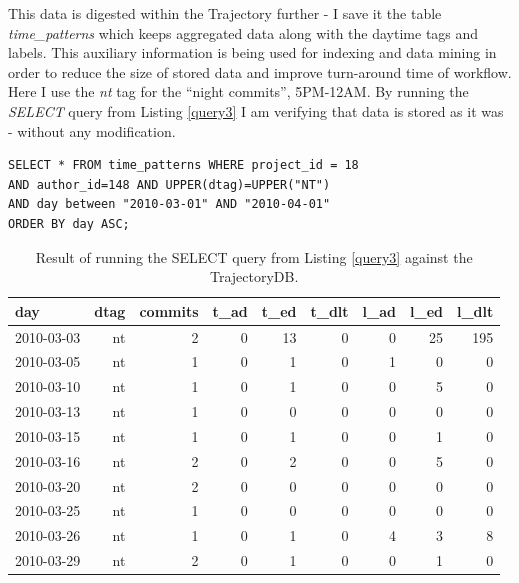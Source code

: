 \documentclass[a4paper,10pt]{article}
\numberwithin{equation}{subsection}
\begin{document}
This data is digested within the Trajectory further - I save it the table \emph{time\_patterns} which keeps aggregated data along with the daytime tags
and labels. This auxiliary information is being used for indexing and data mining in order to reduce the size of stored data and improve turn-around
time of workflow. Here I use the \emph{nt} tag for the ``night commits'', 5PM-12AM. By running the \emph{SELECT} query from Listing \ref{query3} I am 
verifying that data is stored as it was - without any modification.
\noindent\begin{minipage}{\textwidth}
\begin{lstlisting}[label=query3,caption=Data summary from time\_patterns table]
SELECT * FROM time_patterns WHERE project_id = 18
AND author_id=148 AND UPPER(dtag)=UPPER("NT")
AND day between "2010-03-01" AND "2010-04-01"
ORDER BY day ASC;
\end{lstlisting}
\end{minipage}
\begin{table}[h]
\noindent\begin{minipage}{\textwidth}
  \centering
  \caption{Result of running the SELECT query from Listing \ref{query3} against the TrajectoryDB.}
  \begin{tabularx}{0.8\textwidth}{ | X | r | r | r | r | r | r | r | r |}
  \hline           
day & dtag & commits & t\_ad & t\_ed & t\_dlt & l\_ad & l\_ed & l\_dlt\\ 
\hline           
2010-03-03 & nt & 2 & 0 & 13 & 0 & 0 & 25 & 195\\ 
2010-03-05 & nt & 1 & 0 & 1 & 0 & 1 & 0 & 0\\ 
2010-03-10 & nt & 1 & 0 & 1 & 0 & 0 & 5 & 0\\ 
2010-03-13 & nt & 1 & 0 & 0 & 0 & 0 & 0 & 0\\ 
2010-03-15 & nt & 1 & 0 & 1 & 0 & 0 & 1 & 0\\ 
2010-03-16 & nt & 2 & 0 & 2 & 0 & 0 & 5 & 0\\ 
2010-03-20 & nt & 2 & 0 & 0 & 0 & 0 & 0 & 0\\ 
2010-03-25 & nt & 1 & 0 & 0 & 0 & 0 & 0 & 0\\ 
2010-03-26 & nt & 1 & 0 & 1 & 0 & 4 & 3 & 8\\ 
2010-03-29 & nt & 2 & 0 & 1 & 0 & 0 & 1 & 0\\
\hline    
  \end{tabularx}
  \label{prestrings}
\end{minipage}
\end{table}
\end{document}
